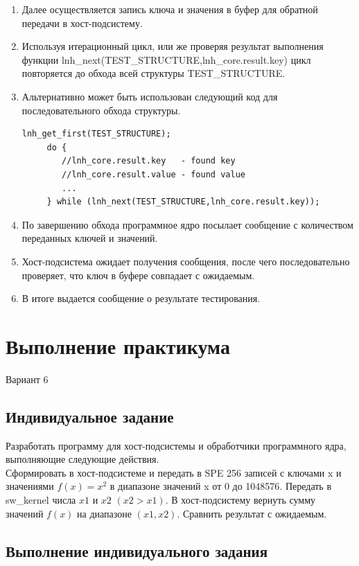 \begin{enumerate}
	\item Далее осуществляется запись ключа и значения в буфер для обратной передачи в хост-подсистему.
	\item Используя итерационный цикл, или же проверяя результат выполнения функции lnh\_next(TEST\_STRUCTURE,lnh\_core.result.key) цикл повторяется до обхода всей структуры TEST\_STRUCTURE.
	\item Альтернативно может быть использован следующий код для последовательного обхода структуры.
\captionsetup{singlelinecheck = false, justification=raggedright}
\begin{lstlisting}[label=code, caption=Код последовательного обхода структуры]
	 lnh_get_first(TEST_STRUCTURE);
	 do {
		//lnh_core.result.key   - found key
		//lnh_core.result.value - found value
		...
	 } while (lnh_next(TEST_STRUCTURE,lnh_core.result.key));
\end{lstlisting}
\captionsetup{singlelinecheck = false, justification=centering}

	\item По завершению обхода программное ядро посылает сообщение с количеством переданных ключей и значений.
	\item Хост-подсистема ожидает получения сообщения, после чего последовательно проверяет, что ключ в буфере совпадает с ожидаемым.
	\item В итоге выдается сообщение о результате тестирования.
\end{enumerate}

\chapter{Выполнение практикума}

Вариант 6

\section{Индивидуальное задание}

Разработать программу для хост-подсистемы и обработчики программного ядра, выполняющие следующие действия.
\\
Сформировать в хост-подсистеме и передать в SPE 256 записей с ключами x и значениями $f(x)=x^2$ в диапазоне значений x от 0 до 1048576. Передать в sw\_kernel числа $x1$ и $x2$ $(x2>x1)$. В хост-подсистему вернуть сумму значений $f(x)$ на диапазоне $(x1,x2)$. Сравнить результат с ожидаемым.

\section{Выполнение индивидуального задания}

